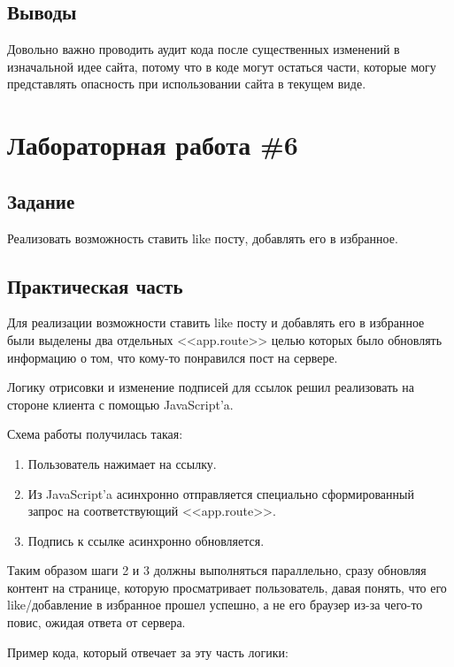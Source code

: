 \documentclass[14pt, a4paper]{extreport}
\begin{document}
\subsection*{Выводы}
Довольно важно проводить аудит кода после существенных изменений
в изначальной идее сайта, потому что в коде могут остаться части, которые могу
представлять опасность при использовании сайта в текущем виде.

\section*{Лабораторная работа \#6}
\subsection*{Задание}
Реализовать возможность ставить like посту, добавлять его в избранное.
\subsection*{Практическая часть}
Для реализации возможности ставить like посту и добавлять его в избранное
были выделены два отдельных <<app.route>> целью которых было обновлять
информацию о том, что кому-то понравился пост на сервере.

Логику отрисовки и изменение подписей для ссылок решил реализовать на стороне
клиента с помощью JavaScript'a.

Схема работы получилась такая:
\begin{enumerate}
\item Пользователь нажимает на ссылку.
\item Из JavaScript'a асинхронно отправляется специально сформированный
  запрос на соответствующий <<app.route>>.
\item  Подпись к ссылке асинхронно обновляется.
\end{enumerate}

Таким образом шаги 2 и 3 должны выполняться параллельно, сразу обновляя контент
на странице, которую просматривает пользователь, давая понять, что его
like/добавление в избранное прошел успешно, а не его браузер из-за чего-то повис,
ожидая ответа от сервера.

Пример кода, который отвечает за эту часть логики:
\end{document}
